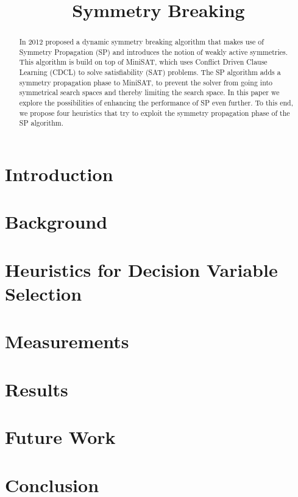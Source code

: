 

\title{Symmetry Breaking}


	\maketitle

	\begin{abstract}
	In 2012 \cite{devriendt2012symmetry} proposed a dynamic symmetry breaking algorithm that makes use of Symmetry Propagation (SP) and introduces the notion of weakly active symmetries. This algorithm is build on top of MiniSAT, which uses Conflict Driven Clause Learning (CDCL) to solve satisfiability (SAT) problems. The SP algorithm adds a symmetry propagation phase to MiniSAT, to prevent the solver from going into symmetrical search spaces and thereby limiting the search space. In this paper we explore the possibilities of enhancing the performance of SP even further. To this end, we propose four heuristics that try to exploit the symmetry propagation phase of the SP algorithm.
	\end{abstract}

	\section{Introduction}
		\label{sec:Introduction}
		

	\section{Background}
		\label{sec:Background}
		

	\section{Heuristics for Decision Variable Selection}
		\label{sec:DecisionVars}
		

	\section{Measurements}
		\label{sec:measurements}
		

	\section{Results}
		\label{sec:Results}
		

		
		

	\section{Future Work}
		\label{sec:FutureWork}
		

	\section{Conclusion}
		\label{sec:Conclusion}
		

	\newpage
	
	

